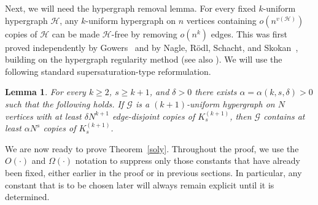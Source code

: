 \documentclass[11pt]{article}
\theoremstyle{plain}
\newtheorem{lemma}[theorem]{Lemma}
\theoremstyle{definition}
\theoremstyle{remark}
\begin{document}
Next, we will need the hypergraph removal lemma. For every fixed $k$-uniform hypergraph $\mathcal H$, any $k$-uniform hypergraph on $n$ vertices containing $o(n^{v(\mathcal H)})$ copies of $\mathcal H$ can be made $\mathcal H$-free by removing $o(n^k)$ edges. This was first proved independently by Gowers~\cite{Gowers2007} and by Nagle, R\"odl, Schacht, and Skokan~\cite{NagleRodlSchacht2006}, building on the hypergraph regularity method (see also \cite{RodlSkokan2004,RodlSchacht2009,Tao2006}). We will use the following standard supersaturation-type reformulation.

\begin{lemma}\label{lem:supersat-hyper}
For every $k\ge 2$, $s\ge k+1$, and $\delta>0$ there exists
$\alpha=\alpha(k,s,\delta)>0$ such that the following holds.
If $\mathcal G$ is a $(k + 1)$-uniform hypergraph on $N$ vertices with at least
$\delta N^{k + 1}$ edge-disjoint copies of $K^{(k + 1)}_s$, then $\mathcal G$
contains at least $\alpha N^s$ copies of $K^{(k + 1)}_s$.
\end{lemma}


We are now ready to prove Theorem~\ref{soly}.  Throughout the proof, we use the \(O(\cdot)\) and \(\Omega(\cdot)\) notation to suppress only those constants that have already been fixed, either earlier in the proof or in previous sections. In particular, any constant that is to be chosen later will always remain explicit until it is determined.
\end{document}
